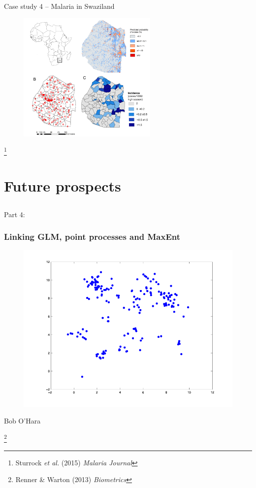 \documentclass[xcolor=x11names, compress]{beamer}
\renewcommand{\(}{\begin{columns}}
\renewcommand{\)}{\end{columns}}
\newcommand{\<}[1]{\begin{column}{#1}}
\renewcommand{\>}{\end{column}}
\begin{document}
\begin{frame}{Case study 4 -- Malaria in Swaziland}
	\begin{figure}
		\includegraphics[height=2.5in]{fig/swazi_results.png}  
	\end{figure}
	\let\thefootnote\relax\footnote{Sturrock \textit{et al.} (2015) \textit{Malaria Journal}}
\end{frame}

\section{Future prospects}
\subsection{}
\begin{frame}
	\Large{Part 4: \insertsection}
\end{frame}

\begin{frame}
\frametitle{Linking GLM, point processes and MaxEnt}
\begin{figure}
	\includegraphics[height=0.4\linewidth]{fig/point_process.png}
\end{figure}
\centerline{Bob O'Hara}
\let\thefootnote\relax\footnote{Renner \& Warton (2013) \textit{Biometrics}}
\end{frame}
\end{document}
